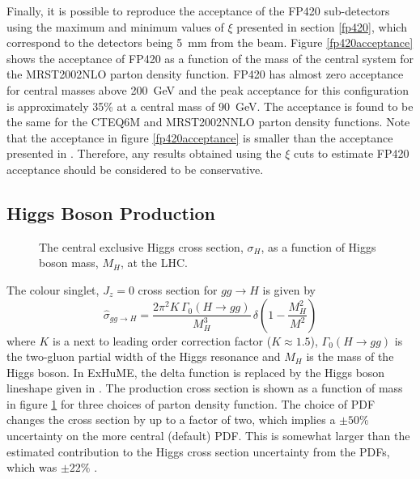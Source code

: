 Finally, it is possible to reproduce the acceptance of the FP420 sub-detectors using the maximum and minimum values of $\xi$ presented in section \ref{fp420}, which correspond to the detectors being 5~mm from the beam. Figure \ref{fp420acceptance} shows the acceptance of FP420 as a function of the mass of the central system for the MRST2002NLO parton density function. FP420 has almost zero acceptance for central masses above 200~GeV and the peak acceptance for this configuration is approximately 35\% at a central mass of 90~GeV. 
The acceptance is found to be the same for the CTEQ6M and MRST2002NNLO parton density  functions. Note that the acceptance in figure \ref{fp420acceptance} is smaller than the acceptance presented in \cite{Cox:2005tb}. Therefore, any results obtained using the $\xi$ cuts to estimate FP420 acceptance should be considered to be conservative.

\subsection{Higgs Boson Production}

\begin{figure} 
\centering
\caption[The central exclusive Higgs cross section as a function of Higgs boson mass at the LHC]{The central exclusive Higgs cross section, $\sigma_{H}$, as a function of Higgs boson mass, $M_H$, at the LHC.\label{higgsXS}}
\end{figure}

The colour singlet, $J_z=0$ cross section for $gg \rightarrow H$ is given \cite{Khoze:2001xm} by
\begin{equation}
\hat{\sigma}_{gg\rightarrow H} = \frac{2\pi^2 K \, \Gamma_0 \left(H\rightarrow gg \right)}{M_H^3}
\, \delta \left( 1- \frac{M_H^2}{M^2}\right)
\end{equation}
where $K$ is a next to leading order correction factor ($K\approx 1.5$), 
$\Gamma_0\left(H \rightarrow gg \right)$ is the two-gluon partial width of the Higgs resonance \cite{Gunion:1989we}
 and $M_H$ is the mass of the Higgs boson. In ExHuME, the delta function is replaced by the Higgs boson lineshape given in \cite{Seymour:1995qg}. 
The production cross section is shown as a function of mass in figure \ref{higgsXS} for three choices of parton density function. The choice of PDF changes the cross section by up to a factor of two, which implies a $\pm50\%$ uncertainty on the more central (default) PDF. This is somewhat larger than the estimated contribution to the Higgs cross section uncertainty from the PDFs, which was $\pm 22\%$  \cite{DeRoeck:2002hk}.

